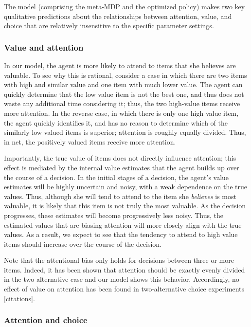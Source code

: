 \documentclass[12pt,a4paperpaper,]{article}
\begin{document}
The model (comprising the meta-MDP and the optimized policy) makes two key qualitative predictions about the relationships between attention, value, and choice that are relatively insensitive to the specific parameter settings.

\subsubsection{Value and attention}

In our model, the agent is more likely to attend to items that she believes are valuable. To see why this is rational, consider a case in which there are two items with high and similar value and one item with much lower value. The agent can quickly determine that the low value item is not the best one, and thus does not waste any additional time considering it; thus, the two high-value items receive more attention. In the reverse case, in which there is only one high value item, the agent quickly identifies it, and has no reason to determine which of the similarly low valued items is superior; attention is roughly equally divided. Thus, in net, the positively valued items receive more attention.

Importantly, the true value of items does not directly influence attention; this effect is mediated by the internal value estimates that the agent builds up over the course of a decision. In the initial stages of a decision, the agent's value estimates will be highly uncertain and noisy, with a weak dependence on the true values. Thus, although she will tend to attend to the item she \emph{believes} is most valuable, it is likely that this item is not truly the most valuable. As the decision progresses, these estimates will become progressively less noisy. Thus, the estimated values that are biasing attention will more closely align with the true values. As a result, we expect to see that the tendency to attend to high value items should increase over the course of the decision.

Note that the attentional bias only holds for decisions between three or more items. Indeed, it has been shown that attention should be exactly evenly divided in the two alternative case \citep{Fudenberg2018} and our model shows this behavior. Accordingly, no effect of value on attention has been found in two-alternative choice experiments {[}citations{]}.

\subsubsection{Attention and choice}
\end{document}
